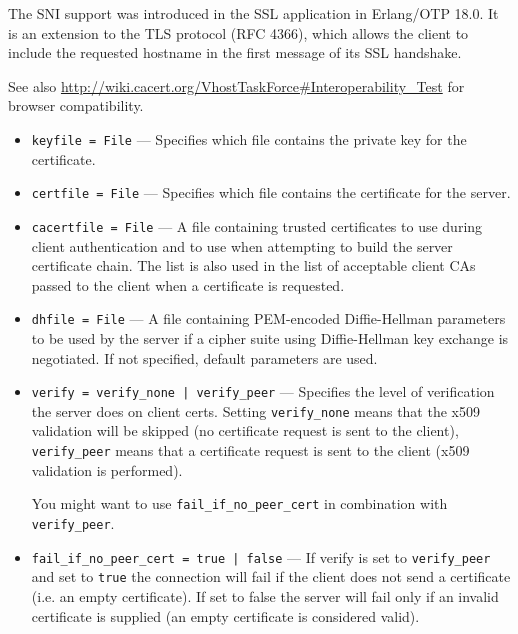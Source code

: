 \documentclass[11pt,oneside,english]{book}
\begin{document}
\begin{itemize}
               The SNI support was introduced in the SSL application in
               Erlang/OTP 18.0. It is an extension to the TLS protocol (RFC
               4366), which allows the client to include the requested hostname
               in the first message of its SSL handshake.

               See also
               \url{http://wiki.cacert.org/VhostTaskForce#Interoperability_Test}
               for browser compatibility.

               \begin{itemize}
               \item \verb+keyfile = File+ --- Specifies which file contains the
                 private key for the certificate.

               \item \verb+certfile = File+ --- Specifies which file contains
                 the certificate for the server.

               \item \verb+cacertfile = File+ --- A file containing trusted
                 certificates to use during client authentication and to use
                 when attempting to build the server certificate chain. The list
                 is also used in the list of acceptable client CAs passed to the
                 client when a certificate is requested.

               \item \verb+dhfile = File+ --- A file containing
                 PEM-encoded Diffie-Hellman parameters to be used by
                 the server if a cipher suite using Diffie-Hellman key
                 exchange is negotiated. If not specified, default
                 parameters are used.

               \item \verb+verify = verify_none | verify_peer+ ---
                 Specifies the level of verification the server does on client
                 certs. Setting \verb+verify_none+ means that the x509
                 validation will be skipped (no certificate request is sent to
                 the client), \verb+verify_peer+ means that a certificate
                 request is sent to the client (x509 validation is performed).

                 You might want to use \verb+fail_if_no_peer_cert+ in
                 combination with \verb+verify_peer+.

               \item \verb+fail_if_no_peer_cert = true | false+ --- If verify is
                 set to \verb+verify_peer+ and set to \verb+true+ the connection
                 will fail if the client does not send a certificate (i.e. an
                 empty certificate). If set to false the server will fail only
                 if an invalid certificate is supplied (an empty certificate is
                 considered valid).


\end{itemize}
\end{itemize}
\end{document}
